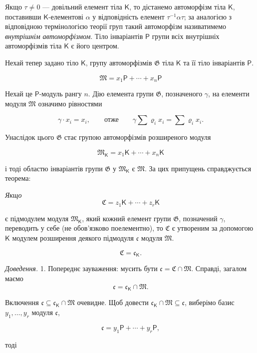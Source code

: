 \documentclass[11pt]{article}
\begin{document}
Якщо \(\tau\ne 0\) --- довільний елемент тіла \(\mathsf K\), то дістанемо автоморфізм тіла \(\mathsf K\), поставивши \(\mathsf K\)-елементові \(\alpha\) у відповідність елемент \(\tau^{-1}\alpha\tau\); за аналогією з відповідною термінологією теорії груп такий автоморфізм називатимемо \emph{внутрішнім автоморфізмом}. Тіло інваріантів \(\mathsf P\) групи всіх внутрішніх автоморфізмів тіла \(\mathsf K\) є його центром.

Нехай тепер задано тіло \(\mathsf K\), групу автоморфізмів \(\mathfrak G\) тіла \(\mathsf K\) та її тіло інваріантів \(\mathsf P\).

\[
\mathfrak M=x_1\mathsf P+\cdots+x_n\mathsf P
\]

Нехай це \(\mathsf P\)-модуль рангу \(n\). Дію елемента групи \(\mathfrak G\), позначеного \(\gamma\), на елементи модуля \(\mathfrak M\) означимо рівностями

\[
\gamma\cdot x_i=x_i,\qquad\text{отже}\qquad
\gamma\sum \varrho_i x_i=\sum \varrho_i x_i.
\]

Унаслідок цього \(\mathfrak G\) стає групою автоморфізмів розширеного модуля

\[
\mathfrak M_{\mathsf K}=x_1\mathsf K+\cdots+x_n\mathsf K
\]

і тоді областю інваріантів групи \(\mathfrak G\) у \(\mathfrak M_{\mathsf K}\) є \(\mathfrak M\). За цих припущень справджується теорема:

\begingroup\itshape
Якщо
\[
\mathfrak C=z_1\mathsf K+\cdots+z_r\mathsf K
\]

є підмодулем модуля \(\mathfrak M_{\mathsf K}\), який кожний елемент групи \(\mathfrak G\), позначений \(\gamma\), переводить у себе (не обов'язково поелементно), то \(\mathfrak C\) є утвореним за допомогою \(\mathsf K\) модулем розширення деякого підмодуля \(\mathfrak c\) модуля \(\mathfrak M\).

\[
\mathfrak C=\mathfrak c_{\mathsf K}.
\]
\endgroup

\emph{Доведення.} 1. Попереднє зауваження: мусить бути \(\mathfrak c=\mathfrak C\cap\mathfrak M\). Справді, загалом маємо
\[
\mathfrak c=\mathfrak c_{\mathsf K}\cap\mathfrak M.
\]

Включення \(\mathfrak c\subseteq\mathfrak c_{\mathsf K}\cap\mathfrak M\) очевидне. Щоб довести \(\mathfrak c_{\mathsf K}\cap\mathfrak M\subseteq\mathfrak c\), виберімо базис \(y_1,\ldots,y_r\) модуля \(\mathfrak c\),

\[
\mathfrak c=y_1\mathsf P+\cdots+y_r\mathsf P,
\]

тоді
\end{document}

